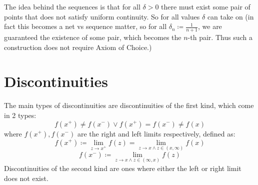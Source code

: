 \documentclass[10pt,letterpaper]{article} %
\begin{document}
\medskip
The idea behind the sequences is that for all $\delta > 0$ there must exist some pair of points that does not satisfy uniform continuity. So for all values $\delta$ can take on (in fact this becomes a net vs sequence matter, so for all $\delta_n \coloneq \frac{1}{n+1}$, we are guaranteed the existence of some pair, which becomes the $n$-th pair. Thus such a construction does not require Axiom of Choice.)


\pagebreak
\section{Discontinuities}
The main types of discontinuities are discontinuities of the first kind, which come in 2 types:
\begin{equation*}
  f(x^+) \neq f(x^-) \lor f(x^+) = f(x^-) \neq f(x)
\end{equation*}
where $f(x^+), f(x^-)$ are the right and left limits respectively, defined as:
\begin{equation*}
f(x^+) \coloneq \lim_{z\xrightarrow{}x^+}f(z) = \lim_{z \xrightarrow{} x \land z \in (x, \infty)}f(x)
\end{equation*}
\begin{equation}
f(x^-) \coloneq \lim_{z \xrightarrow{} x \land z \in (\infty, x)}f(z)
\end{equation}
Discontinuities of the second kind are ones where either the left or right limit does not exist.\\
\end{document}
